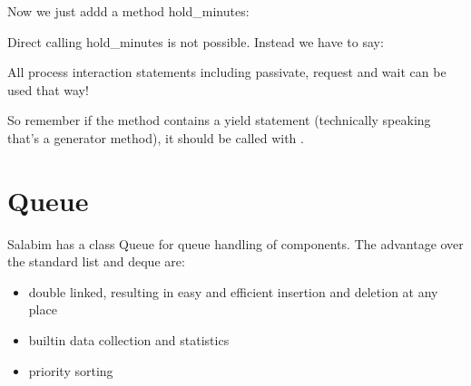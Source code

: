\documentclass[letterpaper,10pt,english]{sphinxmanual}
\begin{document}
Now we just addd a method hold\_minutes:

\begin{sphinxVerbatim}[commandchars=\\\{\}]
  
       
\end{sphinxVerbatim}

Direct calling hold\_minutes is not possible. Instead we have to say:

\begin{sphinxVerbatim}[commandchars=\\\{\}]
 
     
           

    
         
         
\end{sphinxVerbatim}

All process interaction statements including passivate, request and wait can be used that way!

So remember if the method contains a yield statement (technically speaking that’s a generator method), it should be called with .


\chapter{Queue}
\label{\detokenize{Queue::doc}}\label{\detokenize{Queue:queue}}
Salabim has a class Queue for queue handling of components. The advantage over the standard list and deque are:
\begin{itemize}
\item {} 
double linked, resulting in easy and efficient insertion and deletion at any place

\item {} 
builtin data collection and statistics

\item {} 
priority sorting

\end{itemize}
\end{document}
